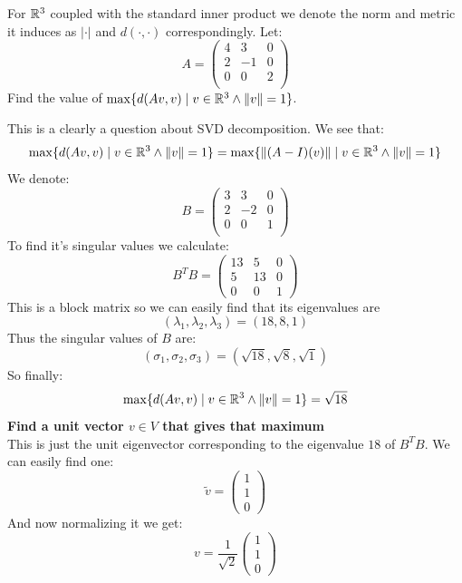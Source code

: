 \documentclass[11pt, a4paper]{article}
\begin{document}
\begin{exercise}
  For $\mathbb{R}^3$ coupled with the standard inner product we denote the
  norm and metric it induces as $|\cdot|$ and $d(\cdot,\cdot)$ 
  correspondingly. Let:
  \[
  A = \begin{pmatrix}
      4 & 3 & 0\\
      2 & -1 & 0\\
      0 & 0 & 2\\
    \end{pmatrix}
  \]
  Find the value of $\max\{d(Av,v) \mid v\in\mathbb{R}^3 \land \|v\| = 1\}$.
\end{exercise}
\begin{solution}
  This is a clearly a question about SVD decomposition. We see that:
  \[
    \max\{d(Av,v) \mid v\in\mathbb{R}^3 \land \|v\| = 1\} =
    \max\{\|(A-I)(v)\| \mid v\in\mathbb{R}^3 \land \|v\| = 1\}
  \]
  We denote:
  \[
    B = \begin{pmatrix}
      3 & 3 & 0\\
      2 & -2 & 0\\
      0 & 0 & 1\\
    \end{pmatrix}
  \]
  To find it's singular values we calculate:
  \[
    B^TB = 
    \left(\begin{matrix}
      13 & 5 & 0 \\
      5 & 13 & 0 \\
      0 & 0 & 1
    \end{matrix}\right)
  \]
  This is a block matrix so we can easily find that its eigenvalues are
  \[
    (\lambda_1, \lambda_2, \lambda_3) = (18,8,1)
  \]
  Thus the singular values of $B$ are:
  \[
    (\sigma_1, \sigma_2, \sigma_3) = (\sqrt{18},\sqrt{8},\sqrt{1})
  \]
  So finally:
  \[
    \max\{d(Av,v) \mid v\in\mathbb{R}^3 \land \|v\| = 1\} = \sqrt{18}
  \]
  \textbf{Find a unit vector $v\in V$ that gives that maximum} \\ 
  This is just the unit eigenvector corresponding to the eigenvalue $18$ of
  $B^TB$. We can easily find one:
  \[
    \tilde{v} = \begin{pmatrix} 1 \\ 1 \\ 0 \end{pmatrix}
  \]
  And now normalizing it we get:
  \[
    v = \frac{1}{\sqrt{2}}\begin{pmatrix} 1 \\ 1 \\ 0 \end{pmatrix}
  \]
\end{solution}
\end{document}
